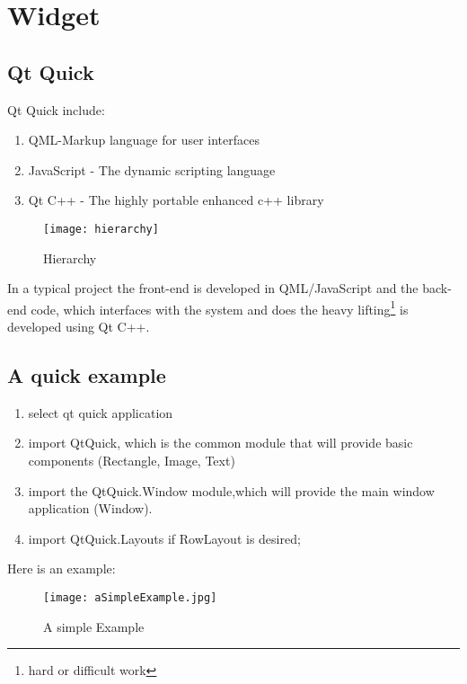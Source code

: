 

\chapter{Widget}

\section{Qt Quick}

Qt Quick include:
\begin{enumerate}
	\item QML-Markup language for user interfaces
	\item JavaScript - The dynamic scripting language
	\item Qt C++ - The highly portable enhanced c++ library
\end{enumerate}


\begin{figure}[h]
	\centering\texttt{[image: hierarchy]}
	\caption{Hierarchy}
\end{figure}
In a typical project the front-end is developed in QML/JavaScript and the back-end code, which interfaces with the system and does the heavy lifting\footnote{hard or difficult work} is developed using Qt C++. 

\section{A quick example}

\begin{enumerate}
	\item select qt quick application
	\item import QtQuick, which is the common module that will provide basic components (Rectangle, Image, Text) 
	\item import the QtQuick.Window module,which will provide the main window application (Window).
	\item import QtQuick.Layouts if  RowLayout is desired;
	 
\end{enumerate}
Here is an example:

\begin{figure}[h]
	\centering\texttt{[image: aSimpleExample.jpg]}
	\caption{A simple Example}
\end{figure}


